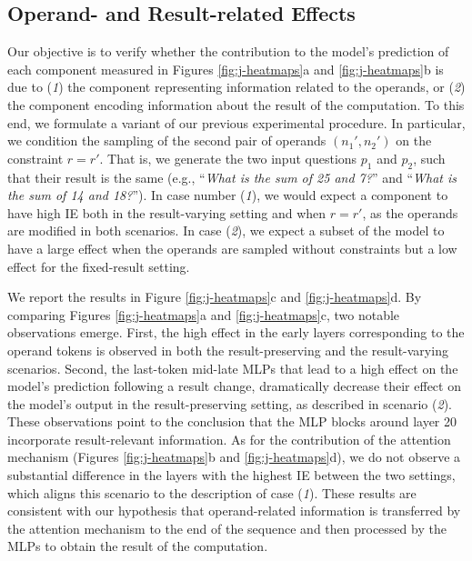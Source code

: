 \documentclass[11pt]{article}
\begin{document}
\subsection{Operand- and Result-related Effects}
\label{sec:undesired}






Our objective is to verify whether the contribution to the model's prediction of each component measured in Figures \ref{fig:j-heatmaps}a and \ref{fig:j-heatmaps}b is due to (\emph{1}) the component representing information related to the operands, or (\emph{2}) the component encoding information about the result of the computation. 
To this end, we formulate a variant of our previous experimental procedure. In particular, we condition the sampling of the second pair of operands $(n_1', n_2')$ on the constraint $r = r'$. That is, we generate the two input questions $p_1$ and $p_2$, such that their result is the same (e.g., ``\textit{What is the sum of 25 and 7?}'' and ``\textit{What is the sum of 14 and 18?}'').
In case number (\emph{1}), we would expect a component to have high IE both in the result-varying setting and when $r = r'$, as the operands are modified in both scenarios. In case  (\emph{2}), we expect a subset of the model to have a large effect when the operands are sampled without constraints but a low effect for the fixed-result setting.

We report the results in Figure \ref{fig:j-heatmaps}c and \ref{fig:j-heatmaps}d. By comparing Figures \ref{fig:j-heatmaps}a and \ref{fig:j-heatmaps}c, two notable observations emerge. First, the high effect in the early layers corresponding to the operand tokens is observed in both the result-preserving and the result-varying scenarios. Second, the last-token mid-late MLPs that lead to a high effect on the model's prediction following a result change, dramatically decrease their effect on the model's output in the result-preserving setting, as described in scenario (\emph{2}). These observations point to the conclusion that the MLP blocks around layer 20 incorporate result-relevant information.
As for the contribution of the attention mechanism (Figures \ref{fig:j-heatmaps}b and \ref{fig:j-heatmaps}d), we do not observe a substantial difference in the layers with the highest IE between the two settings, which aligns this scenario to the description of case (\emph{1}).
These results are consistent with our hypothesis that operand-related information is transferred by the attention mechanism to the end of the sequence and then processed by the MLPs to obtain the result of the computation.
\end{document}
